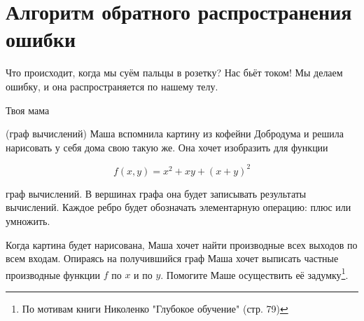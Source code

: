 
\section{Алгоритм обратного распространения ошибки}

\epigraph{Что происходит, когда мы суём пальцы в розетку? Нас бьёт током! Мы делаем ошибку, и она распространяется по нашему телу.}{Твоя мама}


\begin{problem}{(граф вычислений)}
    Маша вспомнила картину из кофейни Добродума и решила нарисовать у себя дома свою такую же. Она хочет изобразить для функции  
    
    $$
    f(x,y) = x^2 + xy + (x + y)^2
    $$ 
    
    граф вычислений. В вершинах графа она будет записывать результаты вычислений. Каждое ребро будет обозначать элементарную операцию: плюс или умножить.
    
    Когда картина будет нарисована, Маша хочет найти производные всех выходов по всем входам. Опираясь на получившийся граф Маша хочет выписать частные производные функции $f$ по $x$ и по $y$. Помогите Маше осуществить её задумку\footnote{По мотивам книги Николенко "Глубокое обучение" (стр. 79)}.
\end{problem} 


